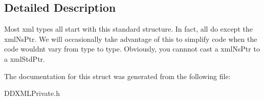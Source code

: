 \subsection{Detailed Description}
Most xml types all start with this standard structure. In fact, all do except the xml\+Ns\+Ptr. We will occasionally take advantage of this to simplify code when the code wouldn\textquotesingle{}t vary from type to type. Obviously, you cannnot cast a xml\+Ns\+Ptr to a xml\+Std\+Ptr. 

The documentation for this struct was generated from the following file\+:\begin{DoxyCompactItemize}
\item 
D\+D\+X\+M\+L\+Private.\+h\end{DoxyCompactItemize}
